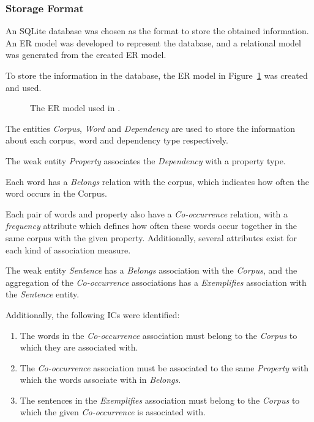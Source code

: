 \subsubsection*{Storage Format}

An SQLite database was chosen as the format to store the obtained information.
An \ac{ER} model was developed to represent the database, and a relational model
was generated from the created \ac{ER} model.

To store the information in the database, the \ac{ER} model in
Figure~\ref{fig:correira2015er} was created and used.

\begin{figure}[ht]
 \caption[ER model of (Correia et al. 2015)]{The \ac{ER} model used in
 \cite{correia2015syntax}.}
 \label{fig:correira2015er}
 \centering
 
\end{figure}

The entities \textit{Corpus}, \textit{Word} and \textit{Dependency} are used to
store the information about each corpus, word and dependency type respectively.

The weak entity \textit{Property} associates the \textit{Dependency} with a
property type.

Each word has a \textit{Belongs} relation with the corpus, which indicates how
often the word occurs in the Corpus.

Each pair of words and property also have a \textit{Co-occurrence} relation,
with a \textit{frequency} attribute which defines how often these words occur
together in the same corpus with the given property. Additionally, several
attributes exist for each kind of association measure.

The weak entity \textit{Sentence} has a \textit{Belongs} association with the
\textit{Corpus}, and the aggregation of the \textit{Co-occurrence} associations
has a \textit{Exemplifies} association with the \textit{Sentence} entity.

Additionally, the following \acp{IC} were identified:

\begin{enumerate}
  \item The words in the \textit{Co-occurrence} association must belong to the
\textit{Corpus} to which they are associated with.
  \item The \textit{Co-occurrence} association must be associated to the same
\textit{Property} with which the words associate with in \textit{Belongs}.
  \item The sentences in the \textit{Exemplifies} association must belong to the
\textit{Corpus} to which the given \textit{Co-occurrence} is associated with.
\end{enumerate}

